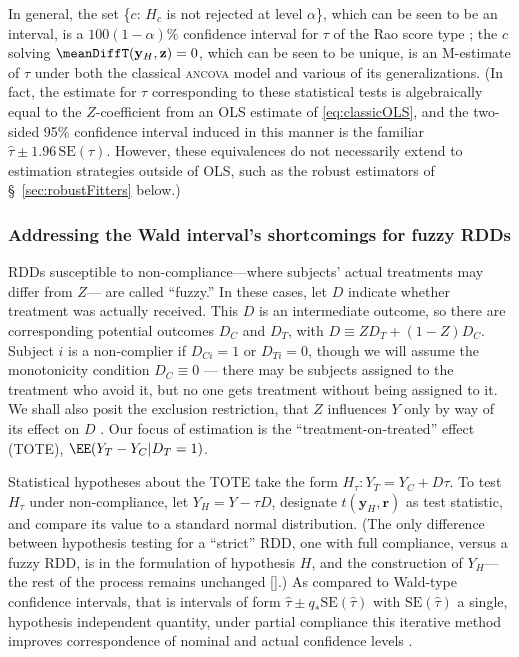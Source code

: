 In general, the set \{$c$:
$H_{c}$ is not rejected at level $\alpha$\}, which can be seen to be an interval, is a
$100(1-\alpha)\%$ confidence interval for $\tau$ of the Rao score type
\citep{agresti2011scoreintervals}; the $c$ solving
$\meanDiffT(\mathbf{y}_{H}, \mathbf{z}) = 0$, which can be seen to
be unique, is an M-estimate of $\tau$ under both the classical
\textsc{ancova} model and various of its generalizations.
(In fact, the estimate for $\tau$ corresponding to these statistical tests is
algebraically equal to the $Z$-coefficient from an OLS estimate of
\eqref{eq:classicOLS}, and the two-sided 95\% confidence interval induced in this
manner is the familiar
$\hat{\tau} \pm 1.96\, \mathrm{SE}(\tau)$.
However, these equivalences do not necessarily extend to estimation
strategies outside of OLS, such as the robust estimators of
\S~\ref{sec:robustFitters} below.)

\subsubsection{Addressing the Wald interval's shortcomings for fuzzy RDDs} \label{sec:fuzzy-regr-disc}
RDDs susceptible to non-compliance---where subjects' actual
treatments may differ from $Z$--- are called ``fuzzy.''
In these cases, let $D$ indicate whether treatment was actually
received.
This $D$ is an intermediate outcome, so there are
corresponding potential outcomes $D_{C}$ and $D_{T}$, with $D \equiv ZD_{T}
+ (1-Z)D_{C}$.
Subject $i$ is a non-complier if $D_{Ci}=1$ or $D_{Ti}=0$, though we
will assume the monotonicity condition $D_{C}\equiv 0$ --- there may be
subjects assigned to the treatment who avoid it, but no one gets
treatment without being assigned to it.
We shall also posit the exclusion restriction,
that $Z$ influences $Y$ only by way of its effect on $D$
\citep{bloom1984ans,Angrist:etal:1996,imbens:rose:2005}.
Our focus of estimation is the
 ``treatment-on-treated'' effect (TOTE),
$\EE(Y_{T} - Y_{C}| D_{T}=1)$.

Statistical hypotheses about the TOTE take the form
$H_\tau:Y_T=Y_C+D\tau$.
To test $H_\tau$ under non-compliance, let $Y_H=Y-\tau D$,
designate $t (\mathbf{y}_H,\mathbf{r})$ as test statistic, and compare
its value to a standard normal distribution.
(The only difference between hypothesis testing for a ``strict'' RDD, one
with full compliance, versus a fuzzy RDD, is in the formulation of
hypothesis $H$, and the construction of $Y_H$---the rest of the
process remains unchanged [\citealp{rosenbaum:1996:onAIR}].)  As compared to Wald-type
confidence intervals, that is intervals of form $\hat\tau \pm q_{*}
\mathrm{SE}(\hat\tau)$ with $\mathrm{SE}(\hat\tau)$ a single,
hypothesis independent quantity, under partial compliance this iterative method
improves correspondence of nominal and actual confidence levels
\citep[Sec.~7]{imbens:rose:2005,baiocchiChengSmall2014IVtutorial}.


